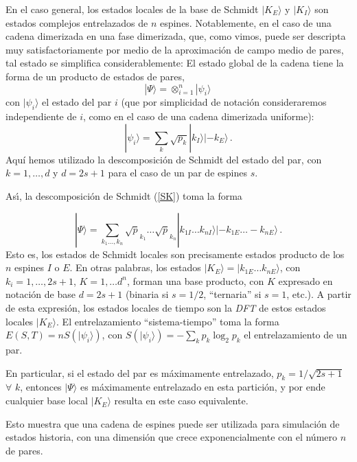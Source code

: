 En el caso general, los estados locales de la base de Schmidt $|K_{E}\rangle$ y $|K_I\rangle$ son estados complejos entrelazados de $n$ espines. 
Notablemente, en el caso de una cadena dimerizada en una fase dimerizada, que, como vimos, puede ser descripta muy satisfactoriamente por medio de la aproximación de campo medio de pares, 
tal estado se simplifica considerablemente: 
El estado global de la cadena tiene la forma de un producto de estados de pares, 
\begin{equation}
|\Psi\rangle=\otimes_{i=1}^n|\psi_i\rangle\,
\end{equation}
con $|\psi_i\rangle$ el estado del par $i$ (que por simplicidad de notación consideraremos independiente de $i$, como en el caso de una cadena dimerizada uniforme):
\begin{equation}|\psi_i\rangle=\sum_{k}\sqrt{p_k}|k_I\rangle|-k_E\rangle\,.\end{equation}
Aquí hemos utilizado la descomposición de Schmidt del estado del par, con $k=1,\ldots,d$ y $d=2s+1$ para el caso de un par de espines $s$. 

As\'{\i}, la descomposición de Schmidt (\ref{SK}) toma la forma 

\begin{equation}
    |\Psi\rangle=\sum_{k_1\ldots,k_n}
    \sqrt{p}_{k_1}\ldots\sqrt{p}_{k_n}|k_{1I}\ldots k_{nI}\rangle|-k_{1E}\ldots -k_{nE}\rangle\,.
\end{equation}
Esto es, los estados de Schmidt locales son precisamente estados producto de los $n$ espines $I$ o $E$. En otras palabras, los estados $|K_E\rangle=|k_{1E}\ldots k_{nE}\rangle$, 
con $k_i=1,\ldots, 2s+1$,  $K=1,\ldots d^n$, 
forman una base producto, con $K$ expresado en notación de base $d=2s+1$ (binaria si $s=1/2$, ``ternaria'' si $s=1$, etc.). A partir de esta expresión, los estados locales de tiempo son la {\it DFT} de estos estados locales $|K_E\rangle$. El entrelazamiento ``sistema-tiempo'' toma la forma 
$E(S,T)=n S(|\psi_i\rangle)$, con $S(|\psi_i\rangle)=-\sum_k p_k \log_2 p_k$ 
el entrelazamiento de un par. 

En particular, si el estado del par es máximamente entrelazado, $p_k=1/\sqrt{2s+1}$ 
$\forall$ $k$, entonces $|\Psi\rangle$ es m\'aximamente entrelazado en esta partición, y por ende cualquier base %
local $|K_E\rangle$ resulta en este caso equivalente. 

Esto muestra que una cadena de espines puede ser utilizada para simulación de estados historia, con una dimensión que crece exponencialmente con el número $n$ de pares. 


